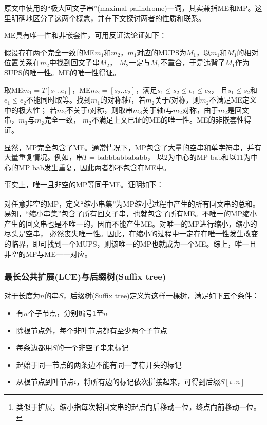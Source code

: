 原文中使用的“极大回文子串”(maximal palindrome)一词，其实兼指ME和MP。这里明确地区分了这两个概念，并在下文探讨两者的性质和联系。

ME具有唯一性和非嵌套性，可用反证法论证如下：

假设存在两个完全一致的ME$m_1$和$m_2$，$m_1$对应的MUPS为$M_1$，以$m_1$和$M_1$的相对位置关系在$m_2$中找到回文子串$M_2$，
$M_2$一定与$M_1$不重合，于是违背了$M_1$作为SUPS的唯一性。ME的唯一性得证。

取ME$m_1 = T[s_1..e_1]$，ME$m_2 = [s_2..e_2]$，满足$s_1 \leq s_2 \leq e_1 \leq e_2 $，
且$s_1 \leq s_2$和$e_1 \leq e_2$不能同时取等。找到$m_1$的对称轴$l$，若$m_2$关于$l$对称，则$m_2$不满足ME定义中的极大性；
若$m_2$不关于$l$对称，则取串$m_3$关于轴$l$与$m_2$对称，由于$m_2$是回文串，$m_3$与$m_2$完全一致，
$m_2$不满足上文已证的ME的唯一性。ME的非嵌套性得证。

显然，MP完全包含了ME。通常情况下，MP包含了大量的空串和单字符串，并有大量重复情况。例如，串$T = \mathrm{babbbabbababb}$，
以2为中心的MP $\mathrm{bab}$和以11为中心的MP $\mathrm{bab}$发生重复，因此两者都不包含在ME中。

事实上，唯一且非空的MP等同于ME。证明如下：

对任意非空的MP，定义“缩小串集”为MP缩小\footnote{类似于扩展，缩小指每次将回文串的起点向后移动一位，终点向前移动一位。}过程中产生的所有回文串的总和。
易知，“缩小串集”包含了所有回文子串，也就包含了所有ME。不唯一的MP缩小产生的回文串也是不唯一的，因而不能产生ME。对唯一的MP进行缩小，缩小的尽头是空串，
必然丧失唯一性。因此，在缩小的过程中一定存在唯一性发生改变的临界，即可找到一个MUPS，则该唯一的MP也就成为一个ME。综上，唯一且非空的MP与ME一一对应。

\subsubsection{最长公共扩展(LCE)与后缀树(Suffix tree)}\label{subsubsec:lce}

对于长度为$n$的串$S$，后缀树(Suffix tree)定义为这样一棵树，满足如下五个条件\cite{suffix}：
\begin{itemize}
    \item 有$n$个子节点，分别编号$1$至$n$
    \item 除根节点外，每个非叶节点都有至少两个子节点
    \item 每条边都用$S$的一个非空子串来标记
    \item 起始于同一节点的两条边不能有同一字符开头的标记
    \item 从根节点到叶节点$i$，将所有边的标记依次拼接起来，可得到后缀$S[i..n]$
\end{itemize}

